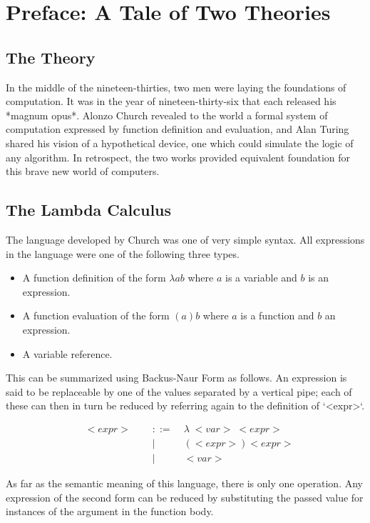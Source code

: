 
\chapter{Preface: A Tale of Two Theories}
\section{The Theory}
In the middle of the nineteen-thirties, two men were laying the foundations of 
computation. It was in the year of nineteen-thirty-six that each released his 
*magnum opus*. Alonzo Church revealed to the world a formal system of computation 
expressed by function definition and evaluation, and Alan Turing shared his vision 
of a hypothetical device, one which could simulate the logic of any algorithm. In 
retrospect, the two works provided equivalent foundation for this brave new world 
of computers.

\section{The Lambda Calculus}
The language developed by Church was one of very simple syntax. All expressions in 
the language were one of the following three types.

\begin{itemize}
  \item A function definition of the form $\lambda a b$ where $a$ is a variable and $b$ is an expression.
  \item A function evaluation of the form $(a)b$ where $a$ is a function and $b$ an expression.
  \item A variable reference.
\end{itemize}

This can be summarized using Backus-Naur Form as follows. An expression is said to 
be replaceable by one of the values separated by a vertical pipe; each of these 
can then in turn be reduced by referring again to the definition of `<expr>`.

\begin{align*}
& <expr> \; &::= \; &\lambda \; <var> \; <expr>
\\& \qquad \qquad \qquad &| \; &(<expr>)<expr>
\\& \qquad \qquad \qquad &| \; &<var>
\end{align*}

As far as the semantic meaning of this language, there is only one operation. Any 
expression of the second form can be reduced by substituting the passed value for 
instances of the argument in the function body.

